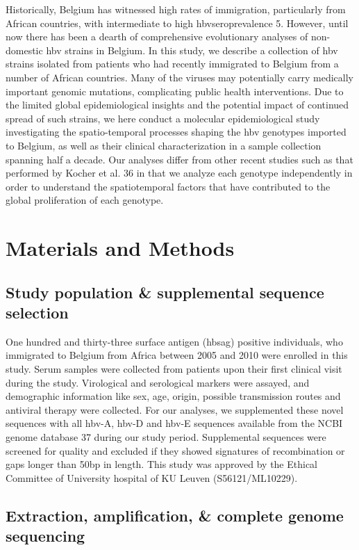 Historically, Belgium has witnessed high rates of immigration, particularly from African countries, with intermediate to high \gls{hbv}seroprevalence 5. However, until now there has been a dearth of comprehensive evolutionary analyses of non-domestic \gls{hbv} strains in Belgium. In this study, we describe a collection of \gls{hbv} strains isolated from patients who had recently immigrated to Belgium from a number of African countries. Many of the viruses may potentially carry medically important genomic mutations, complicating public health interventions. Due to the limited global epidemiological insights and the potential impact of continued spread of such strains, we here conduct a molecular epidemiological study investigating the spatio-temporal processes shaping the \gls{hbv} genotypes imported to Belgium, as well as their clinical characterization in a sample collection spanning half a decade. Our analyses differ from other recent studies such as that performed by Kocher et al. 36 in that we analyze each genotype independently in order to understand the spatiotemporal factors that have contributed to the global proliferation of each genotype.

\section{Materials and Methods}
\subsection{Study population \& supplemental sequence selection}
One hundred and thirty-three surface antigen (\gls{hbsag}) positive individuals, who immigrated to Belgium from Africa between 2005 and 2010 were enrolled in this study. Serum samples were collected from patients upon their first clinical visit during the study. Virological and serological markers were assayed, and demographic information like sex, age, origin, possible transmission routes and antiviral therapy were collected. For our analyses, we supplemented these novel sequences with all \gls{hbv}-A, \gls{hbv}-D and \gls{hbv}-E sequences available from the NCBI genome database 37 during our study period. Supplemental sequences were screened for quality and excluded if they showed signatures of recombination or gaps longer than 50bp in length. This study was approved by the Ethical Committee of University hospital of KU Leuven (S56121/ML10229).\\

\subsection{Extraction, amplification, \& complete genome sequencing}

